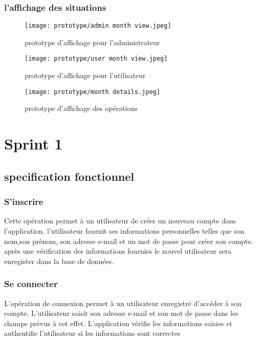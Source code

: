 \subsubsection{l'affichage des situations}
\begin{figure}[h!]
    \begin{minipage}[t]{0.25\textwidth}    %
            \texttt{[image: prototype/admin month view.jpeg]}
            \caption{ prototype d'affichage pour l'administrateur}
      \end{minipage}%
      \begin{minipage}{0.10\textwidth}
        \hfill
      \end{minipage}
    \begin{minipage}[t]{0.25\textwidth}
            \texttt{[image: prototype/user month view.jpeg]}
            \caption{ prototype d'affichage pour l'utilisateur}
    \end{minipage}%
    \begin{minipage}{0.10\textwidth}
        \hfill
    \end{minipage}
      \begin{minipage}[t]{0.25\textwidth}
            \texttt{[image: prototype/month details.jpeg]}
            \caption{ prototype d'affichage des opérations}
    \end{minipage}
    \end{figure}
\section{Sprint 1}
\subsection{specification fonctionnel}
\subsubsection{S'inscrire}
Cette opération permet à un utilisateur de créer un nouveau compte dans l'application.
l'utilisateur fournit ses informations personnelles telles que son nom,son prènom, son adresse e-mail et un mot de passe pour créer son compte. après une vérification des informations fournies le nouvel utilisateur sera enregister dans la  base de données.
\subsubsection{Se connecter}
L'opération de connexion permet à un utilisateur enregistré d'accéder à son compte. L'utilisateur saisit son adresse e-mail et son mot de passe dans les champs prévus à cet effet. L'application vérifie les informations saisies et authentifie l'utilisateur si les informations sont correctes
